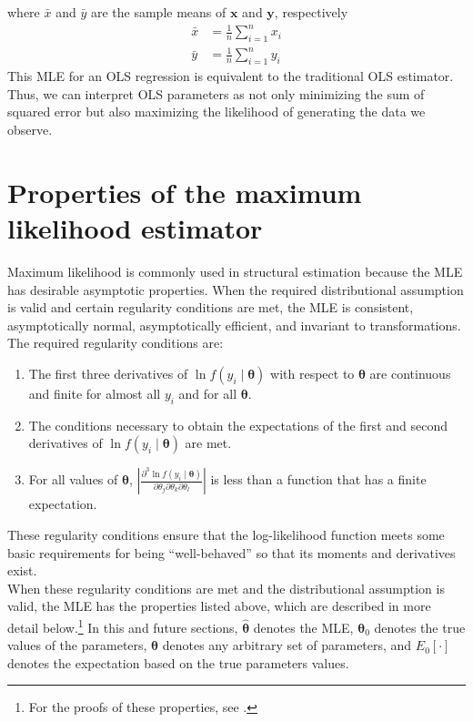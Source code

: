 \documentclass[11pt,letterpaper]{article}
\begin{document}
where $\bar{x}$ and $\bar{y}$ are the sample means of $\bm{x}$ and $\bm{y}$, respectively
\begin{align*}
  \bar{x} & = \frac{1}{n} \sum_{i = 1}^n x_i \\
  \bar{y} & = \frac{1}{n} \sum_{i = 1}^n y_i
\end{align*}
This MLE for an OLS regression is equivalent to the traditional OLS estimator. Thus, we can interpret OLS parameters as not only minimizing the sum of squared error but also maximizing the likelihood of generating the data we observe.

\section{Properties of the maximum likelihood estimator}

Maximum likelihood is commonly used in structural estimation because the MLE has desirable asymptotic properties. When the required distributional assumption is valid and certain regularity conditions are met, the MLE is consistent, asymptotically normal, asymptotically efficient, and invariant to transformations. \\

\noindent The required regularity conditions are:
\begin{enumerate}
  \item The first three derivatives of $\ln f(y_i \mid \bm{\theta})$ with respect to $\bm{\theta}$ are continuous and finite for almost all $y_i$ and for all $\bm{\theta}$.
  \item The conditions necessary to obtain the expectations of the first and second derivatives of ${\ln f(y_i \mid \bm{\theta})}$ are met.
  \item For all values of $\bm{\theta}$, $\left\vert \frac{\partial^3 \ln f(y_i \mid \bm{\theta})}{\partial \theta_j \partial \theta_k \partial \theta_l} \right\vert$ is less than a function that has a finite expectation.
\end{enumerate}
These regularity conditions ensure that the log-likelihood function meets some basic requirements for being ``well-behaved'' so that its moments and derivatives exist. \\

\noindent When these regularity conditions are met and the distributional assumption is valid, the MLE has the properties listed above, which are described in more detail below.\footnote{For the proofs of these properties, see .} In this and future sections, $\widehat{\bm{\theta}}$ denotes the MLE, $\bm{\theta}_0$ denotes the true values of the parameters, $\bm{\theta}$ denotes any arbitrary set of parameters, and $E_0[\cdot]$ denotes the expectation based on the true parameters values. 
\end{document}
